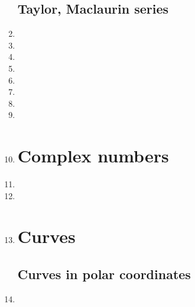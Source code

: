 \documentclass{article}
\begin{document}
\begin{enumerate}
\subsection{Taylor, Maclaurin series}
\item 
\item 
\item 
\item 
\item 


\item 

\item 

\item 
\item 
\section{Complex numbers}
\item 
\item 
\item 
\section{Curves}
\subsection{Curves in polar coordinates}
\item 


\end{enumerate}
\end{document}
